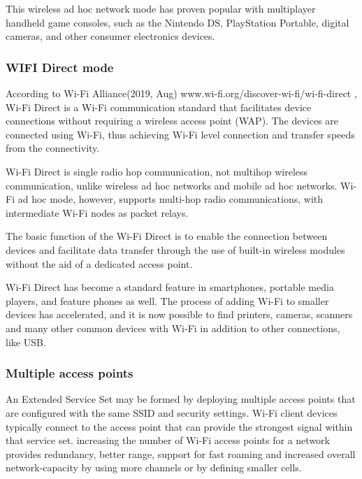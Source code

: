 \vspace{12pt}
This wireless ad hoc network mode has proven popular with multiplayer handheld game consoles, such as the Nintendo DS, PlayStation Portable, digital cameras, and other consumer electronics devices.
\vspace{12pt}

\subsubsection{WIFI Direct mode}


\vspace{12pt}

According to Wi-Fi Alliance(2019, Aug) www.wi-fi.org/discover-wi-fi/wi-fi-direct \cite{WiFiDirect-by-wifi-aliance}, Wi-Fi Direct is a Wi-Fi communication standard that facilitates device connections without requiring a wireless access point (WAP). The devices are connected using Wi-Fi, thus achieving Wi-Fi level connection and transfer speeds from the connectivity.


\vspace{12pt}

Wi-Fi Direct is single radio hop communication, not multihop wireless communication, unlike wireless ad hoc networks and mobile ad hoc networks. Wi-Fi ad hoc mode, however, supports multi-hop radio communications, with intermediate Wi-Fi nodes as packet relays.	
\vspace{12pt}

The basic function of the Wi-Fi Direct is to enable the connection between devices and facilitate data transfer through the use of built-in wireless modules without the aid of a dedicated access point.

\vspace{12pt}
Wi-Fi Direct has become a standard feature in smartphones, portable media players, and feature phones as well. The process of adding Wi-Fi to smaller devices has accelerated, and it is now possible to find printers, cameras, scanners and many other common devices with Wi-Fi in addition to other connections, like USB.
\vspace{12pt}
\clearpage
\subsubsection{Multiple access points}
\vspace{12pt}
An Extended Service Set may be formed by deploying multiple access points that are configured with the same SSID and security settings. Wi-Fi client devices typically connect to the access point that can provide the strongest signal within that service set. increasing the number of Wi-Fi access points for a network provides redundancy, better range, support for fast roaming and increased overall network-capacity by using more channels or by defining smaller cells.
\vspace{12pt}

